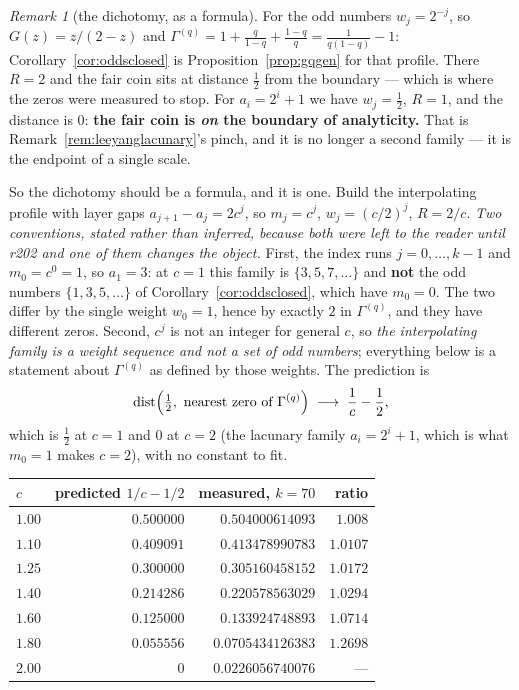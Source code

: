 \documentclass[11pt,a4paper]{article}
\theoremstyle{plain}
\theoremstyle{definition}
\theoremstyle{remark}
\newtheorem{remark}[theorem]{Remark}
\begin{document}
\begin{remark}[the dichotomy, as a formula]\label{rem:pinchformula}
For the odd numbers $w_j=2^{-j}$, so $G(z)=z/(2-z)$ and
$\Gamma^{(q)}=1+\frac{q}{1-q}+\frac{1-q}{q}=\frac{1}{q(1-q)}-1$: Corollary~\ref{cor:oddsclosed}
is Proposition~\ref{prop:gqgen} for that profile. There $R=2$ and the fair coin sits at distance
$\tfrac12$ from the boundary --- which is where the zeros were measured to stop. For
$a_i=2^{i}+1$ we have $w_j=\tfrac12$, $R=1$, and the distance is $0$: \textbf{the fair coin is
\emph{on} the boundary of analyticity.} That is Remark~\ref{rem:leeyanglacunary}'s pinch, and it
is no longer a second family --- it is the endpoint of a single scale.

So the dichotomy should be a formula, and it is one. Build the interpolating profile with layer
gaps $a_{j+1}-a_j=2c^{j}$, so $m_j=c^{j}$, $w_j=(c/2)^{j}$, $R=2/c$.
\emph{Two conventions, stated rather than inferred, because both were left to the reader until
r202 and one of them changes the object.} First, the index runs $j=0,\dots,k-1$ and
\textbf{$m_0=c^{0}=1$}, so $a_1=3$: at $c=1$ this family is $\{3,5,7,\dots\}$ and \textbf{not} the
odd numbers $\{1,3,5,\dots\}$ of Corollary~\ref{cor:oddsclosed}, which have $m_0=0$. The two
differ by the single weight $w_0=1$, hence by exactly $2$ in $\Gamma^{(q)}$, and they have
different zeros. Second, $c^{j}$ is not an integer for general $c$, so \emph{the interpolating
family is a weight sequence and not a set of odd numbers}; everything below is a statement about
$\Gamma^{(q)}$ as defined by those weights. The prediction is
\[
  \operatorname{dist}\Bigl(\tfrac12,\ \text{nearest zero of }\Gamma^{(q)}\Bigr)\;\longrightarrow\;
  \frac1c-\frac12 ,
\]
which is $\tfrac12$ at $c=1$ and $0$ at $c=2$ (the lacunary family $a_i=2^{i}+1$, which is what
$m_0=1$ makes $c=2$), with no constant to fit.

\begin{center}
\begin{tabular}{lrrr}
\hline
$c$ & predicted $1/c-1/2$ & measured, $k=70$ & ratio\\
\hline
$1.00$ & $0.500000$ & $0.504000614093$  & $1.008$\\
$1.10$ & $0.409091$ & $0.413478990783$  & $1.0107$\\
$1.25$ & $0.300000$ & $0.305160458152$  & $1.0172$\\
$1.40$ & $0.214286$ & $0.220578563029$  & $1.0294$\\
$1.60$ & $0.125000$ & $0.133924748893$  & $1.0714$\\
$1.80$ & $0.055556$ & $0.0705434126383$ & $1.2698$\\
$2.00$ & $0$        & $0.0226056740076$ & ---\\
\hline
\end{tabular}
\end{center}


\end{remark}
\end{document}

